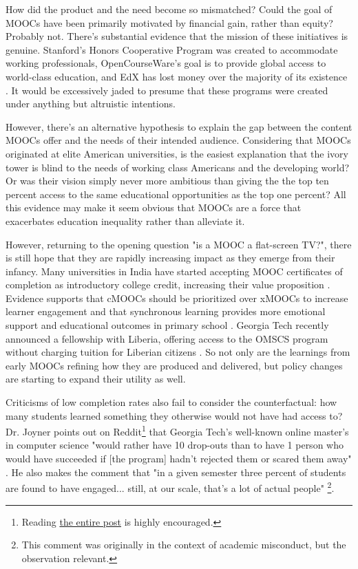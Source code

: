 \documentclass[
	letterpaper, %
]{jdf}
\begin{document}
How did the product and the need become so mismatched? Could the goal of MOOCs have been primarily motivated by financial gain, rather than equity? Probably not. There's substantial evidence that the mission of these initiatives is genuine. Stanford's Honors Cooperative Program was created to accommodate working professionals, OpenCourseWare's goal is to provide global access to world-class education, and EdX has lost money over the majority of its existence . It would be excessively jaded to presume that these programs were created under anything but altruistic intentions. 

However, there's an alternative hypothesis to explain the gap between the content MOOCs offer and the needs of their intended audience. Considering that MOOCs originated at elite American universities, is the easiest explanation that the ivory tower is blind to the needs of working class Americans and the developing world? Or was their vision simply never more ambitious than giving the the top ten percent access to the same educational opportunities as the top one percent? All this evidence may make it seem obvious that MOOCs are a force that exacerbates education inequality rather than alleviate it.

However, returning to the opening question "is a MOOC a flat-screen TV?", there is still hope that they are rapidly increasing impact as they emerge from their infancy. Many universities in India have started accepting MOOC certificates of completion as introductory college credit, increasing their value proposition \cite{hindustan}. Evidence supports that cMOOCs should be prioritized over xMOOCs to increase learner engagement and that synchronous learning provides more emotional support and educational outcomes in primary school \cite{AdvancedEducation2012, Fabriz2021}. Georgia Tech recently announced a fellowship with Liberia, offering access to the OMSCS program without charging tuition for Liberian citizens \cite{GeorgiaTech2023}. So not only are the learnings from early MOOCs refining how they are produced and delivered, but policy changes are starting to expand their utility as well.

Criticisms of low completion rates also fail to consider the counterfactual: how many students learned something they otherwise would not have had access to? Dr. Joyner points out on Reddit\footnote{Reading \href{https://www.reddit.com/r/OMSCS/comments/sgg9ne/comment/huwvec7/}{the entire post} is highly encouraged.} that Georgia Tech's well-known online master's in computer science "would rather have 10 drop-outs than to have 1 person who would have succeeded if [the program] hadn't rejected them or scared them away" . He also makes the comment that "in a given semester three percent of students are found to have engaged... still, at our scale, that's a lot of actual people" \footnote{This comment was originally in the context of academic misconduct, but the observation relevant.}.
\end{document}
